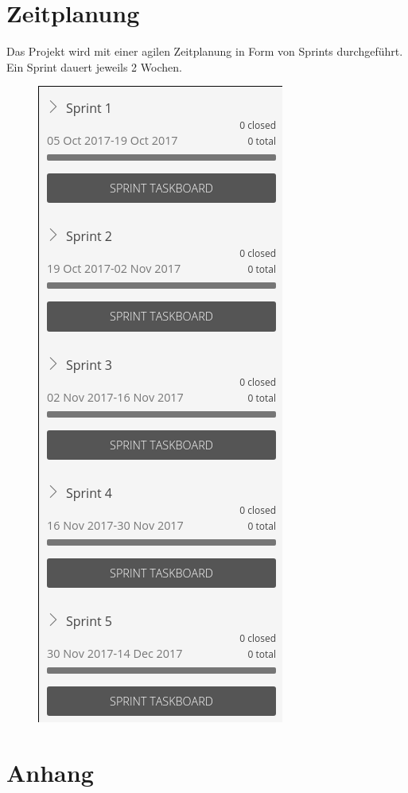 \documentclass[a4paper, 10pt, fleqn]{article}
\begin{document}
	\section{Zeitplanung}
        Das Projekt wird mit einer agilen Zeitplanung in Form von Sprints durchgeführt. Ein Sprint dauert jeweils 2 Wochen.
        \begin{figure}[H]
            \centering
            \includegraphics[width=.5\textwidth]{sprint_overview.png}
        \end{figure}

    \clearpage
    

    \clearpage
    
	

\clearpage
\thispagestyle{empty}
	\section*{Anhang}
    
\end{document}
